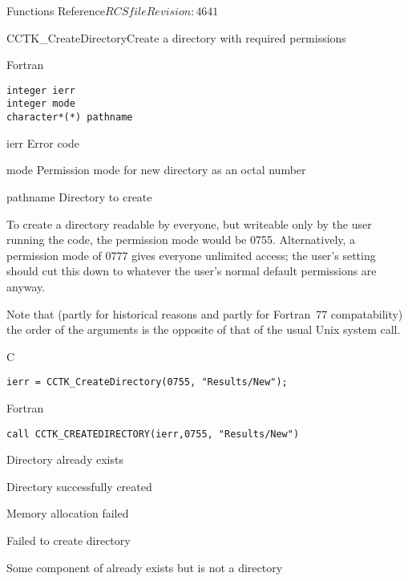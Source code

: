 \begin{cactuspart}{ Functions Reference}{$RCSfile$}{$Revision: 4641 $}
\begin{FunctionDescription}{CCTK\_CreateDirectory}{Create a directory with required permissions}
\begin{SynopsisSection}
\begin{Synopsis}{Fortran}
\begin{verbatim}
integer ierr
integer mode
character*(*) pathname \end{verbatim}
\end{Synopsis}
\end{SynopsisSection}
\begin{ParameterSection}
\begin{Parameter}{ierr}
Error code
\end{Parameter}
\begin{Parameter}{mode}
Permission mode for new directory as an octal number
\end{Parameter}
\begin{Parameter}{pathname}
Directory to create
\end{Parameter}
\end{ParameterSection}
\begin{Discussion}
To create a directory readable by everyone, but writeable only by the
user running the code, the permission mode would be 0755.
Alternatively, a permission mode of 0777 gives everyone unlimited
access; the user's  setting should cut this down to
whatever the user's normal default permissions are anyway.

Note that
(partly for historical reasons and partly for Fortran~77 compatability)
the order of the arguments is the opposite of that of the usual Unix
 system call.
\end{Discussion}
\begin{ExampleSection}
\begin{Example}{C}
\begin{verbatim}
ierr = CCTK_CreateDirectory(0755, "Results/New");
\end{verbatim}
\end{Example}
\begin{Example}{Fortran}
\begin{verbatim}
call CCTK_CREATEDIRECTORY(ierr,0755, "Results/New")
\end{verbatim}
\end{Example}
\end{ExampleSection}
\begin{ErrorSection}
\begin{Error}{1}Directory already exists\end{Error}
\begin{Error}{0}Directory successfully created\end{Error}
\begin{Error}{-1}Memory allocation failed\end{Error}
\begin{Error}{-2}Failed to create directory\end{Error}
\begin{Error}{-3}Some component of  already exists but is not a directory\end{Error}
\end{ErrorSection}
\end{FunctionDescription}



\end{cactuspart}
